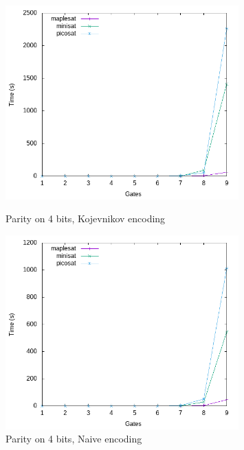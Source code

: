 \documentclass{article}
\begin{document}
\begin{figure}[h!]
\centering


  \includegraphics[width=0.8\textwidth]{images/times/4parity_kulikov.png}  
  \caption{Parity on 4 bits, Kojevnikov encoding}
  \includegraphics[width=0.8\textwidth]{images/times/4parity_naive.png}  
  \caption{Parity on 4 bits, Naive encoding}
\end{figure}
\end{document}
